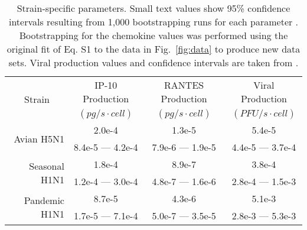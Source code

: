 \documentclass[10pt]{article}
\begin{document}
\begin{table}[!ht]
\centering
\begin{tabular}{ | r | c | c | c | }
  \hline                        
  \multicolumn{1}{|c|}{\multirow{2}{*}{Strain}} & IP-10 Production & RANTES Production & Viral Production \\
   & \footnotesize{$(pg/s\cdot cell)$}  & \footnotesize{$(pg/s\cdot cell)$} &  \footnotesize{$(PFU/s\cdot cell)$} \\
  \hline
  \multirow{2}{*}{Avian H5N1} & 2.0e-4 &  1.3e-5 & 5.4e-5 \\
   &  \footnotesize{8.4e-5 --- 4.2e-4} & \footnotesize{7.9e-6 --- 1.9e-5} & \footnotesize{4.4e-5 --- 3.7e-4}\\ 
   \hline
  \multirow{2}{*}{Seasonal H1N1} & 1.8e-4 &  8.9e-7 & 3.8e-4 \\
   & \footnotesize{1.2e-4 --- 3.0e-4} & \footnotesize{4.8e-7 --- 1.6e-6} & \footnotesize{2.8e-4 --- 1.5e-3}\\
   \hline
  \multirow{2}{*}{Pandemic H1N1} & 8.7e-5 &  4.3e-6 & 5.1e-3 \\
   & \footnotesize{1.7e-5 --- 7.1e-4} & \footnotesize{5.0e-7 --- 3.5e-5} & \footnotesize{2.8e-3 --- 5.3e-3} \\
  \hline
\end{tabular}
\caption{Strain-specific parameters.  Small text values show 95\% confidence intervals resulting from 1,000 bootstrapping runs for each parameter \cite{Wu1986}.  Bootstrapping for the chemokine values was performed using the original fit of Eq. S1 to the data in Fig.~\ref{fig:data} to produce new data sets.  Viral production values and confidence intervals are taken from \cite{Mitchell2011}.}
\label{tab:strains}
\end{table}
\end{document}
